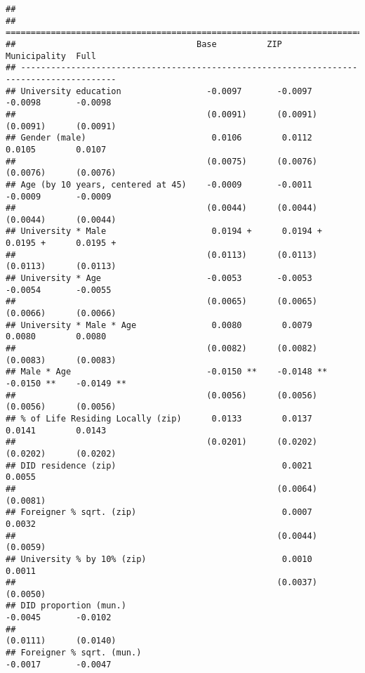 \documentclass[
]{article}
\begin{document}
\begin{verbatim}
## 
## =========================================================================================
##                                    Base          ZIP           Municipality  Full        
## -----------------------------------------------------------------------------------------
## University education                 -0.0097       -0.0097       -0.0098       -0.0098   
##                                      (0.0091)      (0.0091)      (0.0091)      (0.0091)  
## Gender (male)                         0.0106        0.0112        0.0105        0.0107   
##                                      (0.0075)      (0.0076)      (0.0076)      (0.0076)  
## Age (by 10 years, centered at 45)    -0.0009       -0.0011       -0.0009       -0.0009   
##                                      (0.0044)      (0.0044)      (0.0044)      (0.0044)  
## University * Male                     0.0194 +      0.0194 +      0.0195 +      0.0195 + 
##                                      (0.0113)      (0.0113)      (0.0113)      (0.0113)  
## University * Age                     -0.0053       -0.0053       -0.0054       -0.0055   
##                                      (0.0065)      (0.0065)      (0.0066)      (0.0066)  
## University * Male * Age               0.0080        0.0079        0.0080        0.0080   
##                                      (0.0082)      (0.0082)      (0.0083)      (0.0083)  
## Male * Age                           -0.0150 **    -0.0148 **    -0.0150 **    -0.0149 **
##                                      (0.0056)      (0.0056)      (0.0056)      (0.0056)  
## % of Life Residing Locally (zip)      0.0133        0.0137        0.0141        0.0143   
##                                      (0.0201)      (0.0202)      (0.0202)      (0.0202)  
## DID residence (zip)                                 0.0021                      0.0055   
##                                                    (0.0064)                    (0.0081)  
## Foreigner % sqrt. (zip)                             0.0007                      0.0032   
##                                                    (0.0044)                    (0.0059)  
## University % by 10% (zip)                           0.0010                      0.0011   
##                                                    (0.0037)                    (0.0050)  
## DID proportion (mun.)                                            -0.0045       -0.0102   
##                                                                  (0.0111)      (0.0140)  
## Foreigner % sqrt. (mun.)                                         -0.0017       -0.0047   

\end{verbatim}
\end{document}
